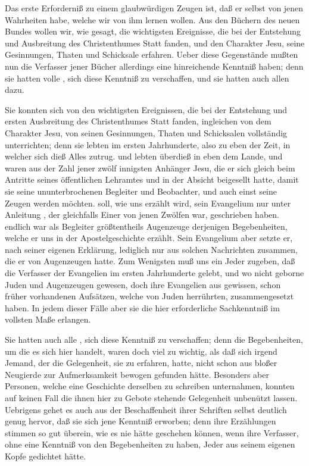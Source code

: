 Das erste Erforderniß zu einem glaubwürdigen Zeugen ist, daß er selbst  von jenen Wahrheiten habe, welche wir von ihm lernen wollen. Aus den Büchern des neuen Bundes wollen wir, wie gesagt, die wichtigsten Ereignisse, die bei der Entstehung und Ausbreitung des Christenthumes Statt fanden, und den Charakter Jesu, seine Gesinnungen, Thaten und Schicksale erfahren. Ueber diese Gegenstände mußten nun die Verfasser jener Bücher allerdings eine hinreichende Kenntniß haben; denn sie hatten volle , sich diese Kenntniß zu verschaffen, und sie hatten auch allen  dazu.
\begin{aufza}
\item Sie konnten sich von den wichtigsten Ereignissen, die bei der Entstehung und ersten Ausbreitung des Christenthumes Statt fanden, ingleichen von dem Charakter Jesu, von seinen Gesinnungen, Thaten und Schicksalen vollständig unterrichten; denn sie lebten im ersten Jahrhunderte, also zu eben der Zeit, in welcher sich dieß Alles zutrug.  und  lebten überdieß in eben dem Lande, und waren aus der Zahl jener zwölf innigsten Anhänger Jesu, die er sich gleich beim Antritte seines öffentlichen Lehramtes und in der Absicht beigesellt hatte, damit sie seine ununterbrochenen Begleiter und Beobachter, und auch einst seine Zeugen werden möchten.  soll, wie uns erzählt wird, sein Evangelium nur unter Anleitung , der gleichfalls Einer von jenen Zwölfen war, geschrieben haben.  endlich war als Begleiter  größtentheils Augenzeuge derjenigen Begebenheiten, welche er uns in der Apostelgeschichte erzählt. Sein Evangelium aber setzte er, nach seiner eigenen Erklärung, lediglich nur aus solchen Nachrichten zusammen, die er von Augenzeugen hatte. Zum Wenigsten muß uns ein Jeder zugeben, daß die Verfasser der Evangelien im ersten Jahrhunderte gelebt, und wo nicht geborne Juden und Augenzeugen gewesen, doch ihre Evangelien aus gewissen, schon früher vorhandenen Aufsätzen, welche von Juden herrührten, zusammengesetzt haben. In jedem dieser Fälle aber  sie die hier erforderliche Sachkenntniß im vollsten Maße erlangen.
\item Sie hatten auch alle , sich diese Kenntniß zu verschaffen; denn die Begebenheiten, um die es sich hier handelt, waren doch viel zu wichtig, als daß sich irgend Jemand, der die Gelegenheit, sie zu erfahren, hatte, nicht schon aus bloßer Neugierde zur Aufmerksamkeit bewogen gefunden hätte. Besonders aber Personen, welche eine Geschichte derselben zu schreiben unternahmen, konnten auf keinen Fall die ihnen hier zu Gebote stehende Gelegenheit unbenützt lassen. Uebrigens gehet es auch aus der Beschaffenheit ihrer Schriften selbst deutlich genug hervor, daß sie sich jene Kenntniß erworben; denn ihre Erzählungen stimmen so gut überein, wie es nie hätte geschehen können, wenn ihre Verfasser, ohne eine Kenntniß von den Begebenheiten zu haben, Jeder aus seinem eigenen Kopfe gedichtet hätte.
\end{aufza}

